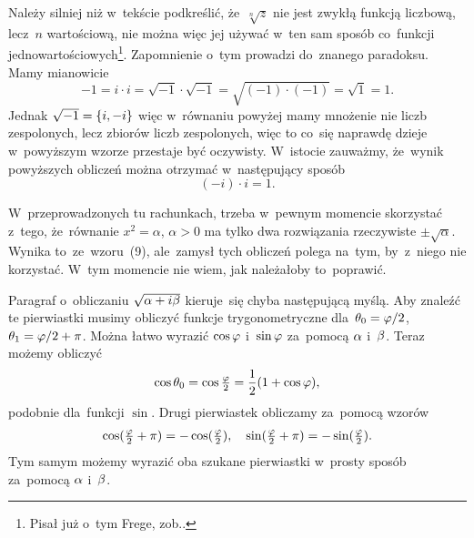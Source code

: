 \documentclass[a4paper,11pt]{article}
\begin{document}
\start {} Należy silniej niż w~tekście podkreślić,
że~$\sqrt[n]{ z }$ nie jest zwykłą funkcją liczbową, lecz~$n$\dywiz
wartościową, nie można więc jej używać w~ten sam sposób co~funkcji
jednowartościowych\footnote{Pisał już o~tym Frege,
  zob..}. Zapomnienie o~tym prowadzi do~znanego
paradoksu. Mamy mianowicie
\begin{equation}
  \label{eq:Leja-07}
  -1 = i \cdot i = \sqrt{ -1 } \cdot \sqrt{ -1 } 
  = \sqrt{ ( -1 ) \cdot ( -1 ) } = \sqrt{ 1 } = 1.
\end{equation}
Jednak $\sqrt{ -1 } = \{  i, -i  \}$ więc w~równaniu powyżej mamy
mnożenie nie liczb zespolonych, lecz zbiorów liczb zespolonych, więc
to co~się naprawdę dzieje w~powyższym wzorze przestaje być oczywisty.
W~istocie zauważmy, że~wynik powyższych obliczeń można otrzymać
w~następujący sposób
\begin{equation}
  \label{eq:Leja-08}
  ( -i ) \cdot i = 1.
\end{equation}

\vspace{\spaceFour}


\start {} W~przeprowadzonych tu rachunkach, trzeba w~pewnym
momencie skorzystać z~tego, że~równanie $x^{ 2 } = \alpha$,
$\alpha > 0$ ma tylko dwa rozwiązania rzeczywiste
$\pm \sqrt{ \alpha }$. Wynika to~ze~wzoru~(9), ale~zamysł tych
obliczeń polega na~tym, by~z~niego nie korzystać. W~tym momencie nie
wiem, jak należałoby to~poprawić.

\vspace{\spaceFour}


\start {} Paragraf o~obliczaniu $\sqrt{ \alpha + i \beta }$
kieruje~się chyba następującą myślą. Aby znaleźć te pierwiastki musimy
obliczyć funkcje trygonometryczne dla~$\theta_{ 0 } = \varphi / 2$,
$\theta_{ 1 } = \varphi / 2 + \pi$. Można łatwo wyrazić $\cos \varphi$
i~$\sin \varphi$ za~pomocą $\alpha$ i~$\beta$. Teraz możemy obliczyć
\begin{equation}
  \label{eq:Leja-09}
  \begin{split}
    \cos \theta_{ 0 } = \cos \tfrac{ \varphi }{ 2 } = \frac{ 1 }{ 2 } ( 1 + \cos
    \varphi ),
  \end{split}
\end{equation}
podobnie dla~funkcji $\sin$. Drugi pierwiastek obliczamy za~pomocą
wzorów
\begin{equation}
  \label{eq:Leja-10}
  \begin{split}
    \cos( \tfrac{ \varphi }{ 2 } + \pi ) = -\cos( \tfrac{ \varphi }{ 2 } ), \quad
    \sin( \tfrac{ \varphi }{ 2 } + \pi ) = -\sin( \tfrac{ \varphi }{ 2 } ).
  \end{split}
\end{equation}
Tym samym możemy wyrazić oba szukane pierwiastki w~prosty sposób
za~pomocą $\alpha$ i~$\beta$.
\end{document}
